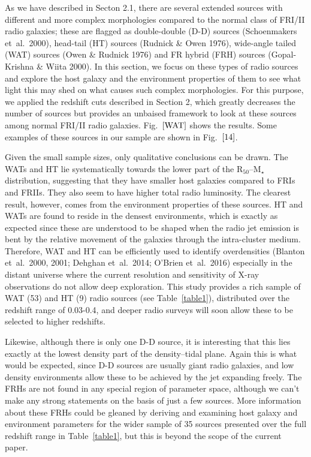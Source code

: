 \documentclass[usenatbib]{mn2e}
\begin{document}
As we have described in Secton 2.1, there are several extended sources
with different and more complex morphologies compared to the normal class
of FRI/II radio galaxies; these are flagged as double-double (D-D) sources
(Schoenmakers et~al.\ 2000), head-tail (HT) sources (Rudnick \& Owen
1976), wide-angle tailed (WAT) sources (Owen \& Rudnick 1976) and FR
hybrid (FRH) sources (Gopal-Krishna \& Wiita 2000). In this section, we
focus on these types of radio sources and explore the host galaxy and the
environment properties of them to see what light this may shed on what
causes such complex morphologies. For this purpose, we applied the
redshift cuts described in Section 2, which greatly decreases the number
of sources but provides an unbaised framework to look at these sources
among normal FRI/II radio galaxies. Fig.~$\ref{WAT}$ shows the results. Some
examples of these sources in our sample are shown in Fig.~$\ref{14}$.

Given the small sample sizes, only qualitative conclusions can be drawn.
The WATs and HT lie systematically towards the lower part of the
R$_{50}$--M$_{\star}$ distribution, suggesting that they have smaller host
galaxies compared to FRIs and FRIIs. They also seem to have higher total
radio luminosity. The clearest result, however, comes from the environment
properties of these sources. HT and WATs are found to reside in the
densest environments, which is exactly as expected since these are
understood to be shaped when the radio jet emission is bent by the
relative movement of the galaxies through the intra-cluster medium.
Therefore, WAT and HT can be efficiently used to identify overdensities
(Blanton et~al.\ 2000, 2001; Dehghan et~al.\ 2014; O'Brien et~al.\ 2016)
especially in the distant universe where the current resolution and
sensitivity of X-ray observations do not allow deep exploration. This
study provides a rich sample of WAT (53) and HT (9) radio sources (see
Table~\ref{table1}), distributed over the redshift range of 0.03-0.4, and
deeper radio surveys will soon allow these to be selected to higher
redshifts.

Likewise, although there is only one D-D source, it is interesting that
this lies exactly at the lowest density part of the density--tidal plane.
Again this is what would be expected, since D-D sources are usually giant
radio galaxies, and low density environments allow these to be achieved by
the jet expanding freely. The FRHs are not found in any special region of
parameter space, although we can't make any strong statements on the basis
of just a few sources. More information about these FRHs could be gleaned
by deriving and examining host galaxy and environment parameters for the
wider sample of 35 sources presented over the full redshift range in
Table~\ref{table1}, but this is beyond the scope of the current paper.
\end{document}
